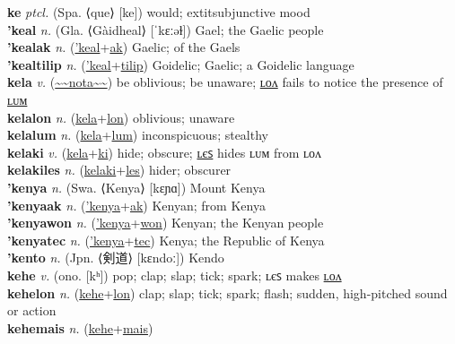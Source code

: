 \textbf{ke} \textit{ptcl.} (Spa. ⟨que⟩ [ke])
would; 	extit{subjunctive mood} \label{ke} \\
\textbf{'keal} \textit{n.} (Gla. ⟨Gàidheal⟩ [ˈkɛːəɫ])
Gael; the Gaelic people \label{'keal} \\
\textbf{'kealak} \textit{n.} (\hyperref['keal]{'keal}+\hyperref[ak]{ak})
Gaelic; of the Gaels \label{'kealak} \\
\textbf{'kealtilip} \textit{n.} (\hyperref['keal]{'keal}+\hyperref[tilip]{tilip})
Goidelic; Gaelic; a Goidelic language \label{'kealtilip} \\
\textbf{kela} \textit{v.} (\hyperref[nota]{\~{}\~{}nota\~{}\~{}})
be oblivious; be unaware; \hyperref[kelalon]{ʟᴏᴧ} fails to notice the presence of \hyperref[kelalum]{ʟᴜᴍ} \label{kela} \\
\textbf{kelalon} \textit{n.} (\hyperref[kela]{kela}+\hyperref[lon]{lon})
oblivious; unaware \label{kelalon} \\
\textbf{kelalum} \textit{n.} (\hyperref[kela]{kela}+\hyperref[lum]{lum})
inconspicuous; stealthy \label{kelalum} \\
\textbf{kelaki} \textit{v.} (\hyperref[kela]{kela}+\hyperref[ki]{ki})
hide; obscure; \hyperref[kelakiles]{ʟєꜱ} hides ʟᴜᴍ from ʟᴏᴧ \label{kelaki} \\
\textbf{kelakiles} \textit{n.} (\hyperref[kelaki]{kelaki}+\hyperref[les]{les})
hider; obscurer \label{kelakiles} \\
\textbf{'kenya} \textit{n.} (Swa. ⟨Kenya⟩ [kɛɲɑ])
Mount Kenya \label{'kenya} \\
\textbf{'kenyaak} \textit{n.} (\hyperref['kenya]{'kenya}+\hyperref[ak]{ak})
Kenyan; from Kenya \label{'kenyaak} \\
\textbf{'kenyawon} \textit{n.} (\hyperref['kenya]{'kenya}+\hyperref[won]{won})
Kenyan; the Kenyan people \label{'kenyawon} \\
\textbf{'kenyatec} \textit{n.} (\hyperref['kenya]{'kenya}+\hyperref[tec]{tec})
Kenya; the Republic of Kenya \label{'kenyatec} \\
\textbf{'kento} \textit{n.} (Jpn. ⟨剣道⟩ [kɛndoː])
Kendo \label{'kento} \\
\textbf{kehe} \textit{v.} (ono. [kʰ])
pop; clap; slap; tick; spark; ʟєꜱ makes \hyperref[kehelon]{ʟᴏᴧ} \label{kehe} \\
\textbf{kehelon} \textit{n.} (\hyperref[kehe]{kehe}+\hyperref[lon]{lon})
clap; slap; tick; spark; flash; sudden, high-pitched sound or action \label{kehelon} \\
\textbf{kehemais} \textit{n.} (\hyperref[kehe]{kehe}+\hyperref[mais]{mais})
